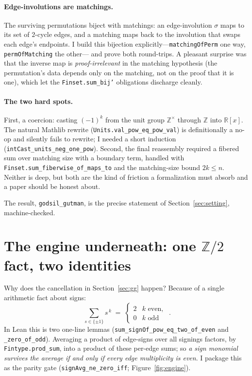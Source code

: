 \documentclass[11pt]{article}
\newcommand{\lean}[1]{\texttt{#1}}
\newcommand{\Z}{\mathbb{Z}}
\newcommand{\R}{\mathbb{R}}
\begin{document}
\paragraph{Edge-involutions are matchings.}
The surviving permutations biject with matchings: an edge-involution
$\sigma$ maps to its set of $2$-cycle edges, and a matching maps back to the
involution that swaps each edge's endpoints. I build this bijection
explicitly---\lean{matchingOfPerm} one way, \lean{permOfMatching} the other---
and prove both round-trips. A pleasant surprise was that the inverse map is
\emph{proof-irrelevant} in the matching hypothesis (the permutation's data
depends only on the matching, not on the proof that it is one), which let the
\lean{Finset.sum\_bij'} obligations discharge cleanly.

\paragraph{The two hard spots.}
First, a coercion: casting $(-1)^k$ from the unit group $\Z^\times$ through
$\Z$ into $\R[x]$. The natural Mathlib rewrite
(\lean{Units.val\_pow\_eq\_pow\_val}) is definitionally a no-op and silently
fails to rewrite; I needed a short induction
(\lean{intCast\_units\_neg\_one\_pow}). Second, the final reassembly required a
fibered sum over matching size with a boundary term, handled with
\lean{Finset.sum\_fiberwise\_of\_maps\_to} and the matching-size bound
$2k\le n$. Neither is deep, but both are the kind of friction a formalization
must absorb and a paper should be honest about.

The result, \lean{godsil\_gutman}, is the precise statement of
Section~\ref{sec:setting}, machine-checked.

\section{The engine underneath: one $\Z/2$ fact, two identities}
\label{sec:engine}

Why does the cancellation in Section~\ref{sec:gg} happen? Because of a single
arithmetic fact about signs:
\[
  \boxed{\;\sum_{s\in\{\pm1\}} s^{\,k}
  \;=\;
  \begin{cases} 2 & k\text{ even},\\ 0 & k\text{ odd}\end{cases}\;}.
\]
In Lean this is two one-line lemmas (\lean{sum\_signOf\_pow\_eq\_two\_of\_even}
and \lean{\_zero\_of\_odd}). Averaging a product of edge-signs over all signings
factors, by \lean{Fintype.prod\_sum}, into a product of these per-edge sums; so
\emph{a sign monomial survives the average if and only if every edge
multiplicity is even}. I package this as the parity gate
(\lean{signAvg\_ne\_zero\_iff}; Figure~\ref{fig:engine}).
\end{document}
